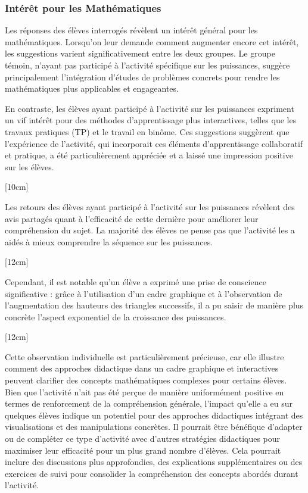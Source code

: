 \subsubsection{Intérêt pour les Mathématiques}

Les réponses des élèves interrogés révèlent un intérêt général pour les mathématiques.
Lorsqu'on leur demande comment augmenter encore cet intérêt,
les suggestions varient significativement entre les deux groupes.
Le groupe témoin,
n'ayant pas participé à l'activité spécifique sur les puissances,
suggère principalement l'intégration d'études de problèmes concrets pour rendre les mathématiques plus applicables et engageantes.

\vspace*{0.5cm}

En contraste,
les élèves ayant participé à l'activité sur les puissances expriment un vif intérêt pour des méthodes d'apprentissage plus interactives,
telles que les travaux pratiques (TP) et le travail en binôme.
Ces suggestions suggèrent que l'expérience de l'activité,
qui incorporait ces éléments d'apprentissage collaboratif et pratique,
a été particulièrement appréciée et a laissé une impression positive sur les élèves.


[10cm]

Les retours des élèves ayant participé à l'activité sur les puissances révèlent des avis partagés quant à l'efficacité de cette dernière pour améliorer leur compréhension du sujet.
La majorité des élèves ne pense pas que l'activité les a aidés à mieux comprendre la séquence sur les puissances.

[12cm]

Cependant,
il est notable qu'un élève a exprimé une prise de conscience significative :
grâce à l'utilisation d'un cadre graphique et à l'observation de l'augmentation des hauteurs des triangles successifs,
il a pu saisir de manière plus concrète l'aspect exponentiel de la croissance des puissances.

[12cm]

Cette observation individuelle est particulièrement précieuse,
car elle illustre comment des approches didactique dans un cadre graphique et interactives peuvent clarifier des concepts mathématiques complexes pour certains élèves.\\

Bien que l'activité n'ait pas été perçue de manière uniformément positive en termes de renforcement de la compréhension générale,
l'impact qu'elle a eu sur quelques élèves indique un potentiel pour des approches didactiques intégrant des visualisations et des manipulations concrètes.
Il pourrait être bénéfique d'adapter ou de compléter ce type d'activité avec d'autres stratégies didactiques pour maximiser leur efficacité pour un plus grand nombre d'élèves.
Cela pourrait inclure des discussions plus approfondies,
des explications supplémentaires ou des exercices de suivi pour consolider la compréhension des concepts abordés durant l'activité.